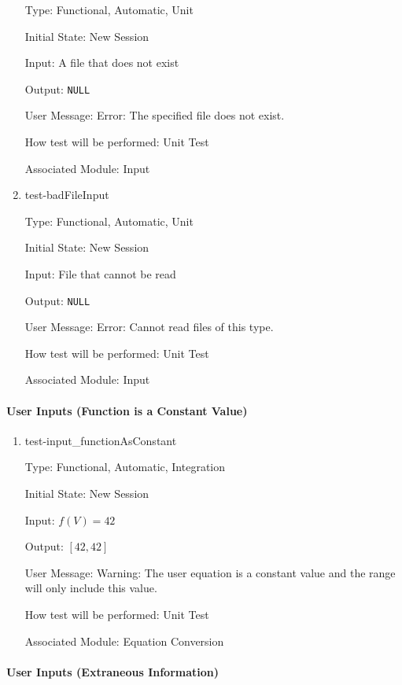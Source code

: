 \documentclass[12pt, titlepage]{article}
\begin{document}
\begin{enumerate}
	Type: Functional, Automatic, Unit
	
	Initial State: New Session
	
	Input: A file that does not exist
	
	Output: \texttt{NULL}
	
	User Message: Error: The specified file does not exist.
	
	How test will be performed: Unit Test
	
	Associated Module: Input\\
	
	\item{test-badFileInput}
	
	Type: Functional, Automatic, Unit
	
	Initial State: New Session
	
	Input: File that cannot be read
	
	Output: \texttt{NULL}
	
	User Message: Error: Cannot read files of this type.
	
	How test will be performed: Unit Test
	
	Associated Module: Input\\
\end{enumerate}
	
\paragraph{User Inputs (Function is a Constant Value)}

\begin{enumerate}	
	\item{test-input\_functionAsConstant}
	
	Type: Functional, Automatic, Integration
	
	Initial State: New Session
	
	Input: $f(V) = 42$
	
	Output:	$[42,42]$
	
	User Message: Warning: The user equation is a constant value and the range 
	will only include this value.
	
	How test will be performed: Unit Test
	
	Associated Module: Equation Conversion\\
\end{enumerate}
	
\paragraph{User Inputs (Extraneous Information)}
	
\end{document}
